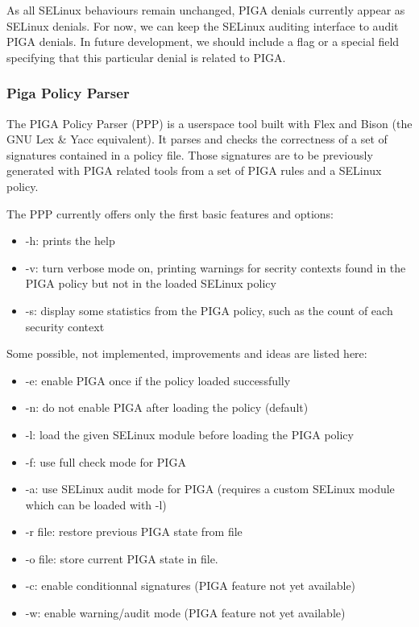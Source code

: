 \documentclass[pdftex,a4paper,titlepage,11pt]{article}
\begin{document}
\bigskip

As all SELinux behaviours remain unchanged, PIGA denials currently appear as
SELinux denials. For now, we can keep the SELinux auditing interface to audit
PIGA denials. In future development, we should include a flag or a special field
specifying that this particular denial is related to PIGA.

\subsubsection{Piga Policy Parser}

The PIGA Policy Parser (PPP) is a userspace tool built with Flex and Bison (the
GNU Lex \& Yacc equivalent). It parses and checks the correctness of a set of
signatures contained in a policy file. Those signatures are to be previously
generated with PIGA related tools from a set of PIGA rules and a SELinux policy.

The PPP currently offers only the first basic features and options:
\begin{itemize}
	\item -h: prints the help
	\item -v: turn verbose mode on, printing warnings for secrity contexts found
in the PIGA policy but not in the loaded SELinux policy
	\item -s: display some statistics from the PIGA policy, such as the count of
each security context
\end{itemize}

\smallskip

Some possible, not implemented, improvements and ideas are listed here:
\begin{itemize}
	\item -e: enable PIGA once if the policy loaded successfully
	\item -n: do not enable PIGA after loading the policy (default)
	\item -l: load the given SELinux module before loading the PIGA policy
	\item -f: use full check mode for PIGA
	\item -a: use SELinux audit mode for PIGA (requires a custom SELinux module
which can be loaded with -l)
	\item -r file: restore previous PIGA state from file
	\item -o file: store current PIGA state in file.
	\item -c: enable conditionnal signatures (PIGA feature not yet available)
	\item -w: enable warning/audit mode (PIGA feature not yet available)
\end{itemize}
\end{document}
